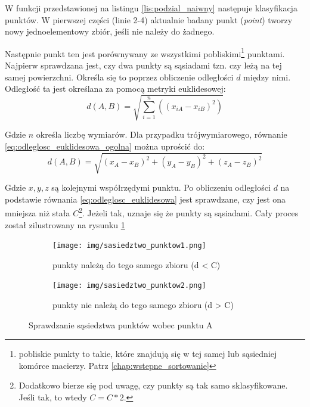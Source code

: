 W funkcji przedstawionej na listingu \ref{lis:podzial_naiwny} następuje klasyfikacja punktów.
W pierwszej części (linie 2-4) aktualnie badany punkt (\textit{point}) tworzy nowy jednoelementowy zbiór,
jeśli nie należy do żadnego.

Następnie punkt ten jest porównywany ze wszystkimi pobliskimi\footnote{pobliskie punkty to takie,
które znajdują się w tej samej lub sąsiedniej komórce macierzy. Patrz \autoref{chap:wstepne_sortowanie}}
punktami. Najpierw sprawdzana jest, czy dwa punkty są sąsiadami tzn. czy leżą na tej samej powierzchni. 
Określa się to poprzez obliczenie odległości $d$ między nimi. Odległość ta jest określana za pomocą  metryki euklidesowej:
\begin{equation} \label{eq:odleglosc_euklidesowa_ogolna}
    d(A,B) = \sqrt{\sum\limits_{i=1}^n((x_{iA}-x_{iB})^2)}
\end{equation}

\noindent Gdzie $n$ określa liczbę wymiarów. Dla przypadku trójwymiarowego, równanie \ref{eq:odleglosc_euklidesowa_ogolna} można uprościć do:
\begin{equation} \label{eq:odleglosc_euklidesowa}
    d(A,B) = \sqrt{(x_A - x_B)^2 + (y_A - y_B)^2 + (z_A - z_B)^2}
\end{equation}

Gdzie $x, y, z$ są kolejnymi współrzędymi punktu. Po obliczeniu odległości $d$ na podstawie równania \ref{eq:odleglosc_euklidesowa}
jest sprawdzane, czy jest ona mniejsza niż stała $C$\footnote{Dodatkowo bierze się pod uwagę, czy punkty są tak samo sklasyfikowane.
Jeśli tak, to wtedy $C = C*2$.}. Jeżeli tak, uznaje się że punkty są sąsiadami. Cały proces został zilustrowany na
rysunku \ref{fig:sprawdzanie_sasiedztwa}

\begin{figure}[h!]
    \centering
    \begin{subfigure}[b]{0.3\textwidth}
        \texttt{[image: img/sasiedztwo\_punktow1.png]}
        \caption {punkty należą do tego samego zbioru (d < C)}
    \end{subfigure}
    \quad
    \begin{subfigure}[b]{0.3\textwidth}
        \texttt{[image: img/sasiedztwo\_punktow2.png]}
        \caption {punkty nie należą do tego samego zbioru (d > C)}
    \end{subfigure}%
    \caption{Sprawdzanie sąsiedztwa punktów wobec punktu A}
    \label{fig:sprawdzanie_sasiedztwa}
\end{figure}


